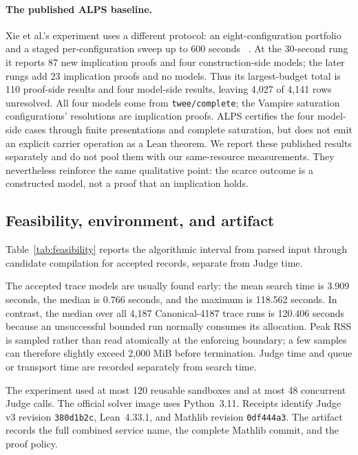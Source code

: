 \documentclass[runningheads]{llncs}
\begin{document}
\paragraph{The published ALPS baseline.}
Xie et al.'s experiment uses a different protocol: an eight-configuration
portfolio and a staged per-configuration sweep up to 600 seconds
~\cite{XieEtAl2026ALPS,ALPSData2026}.  At the 30-second rung it reports 87 new
implication proofs and four construction-side models; the later rungs add 23
implication proofs and no models.  Thus its largest-budget total is 110
proof-side results and four model-side results, leaving 4,027 of 4,141 rows
unresolved.  All four models come from \texttt{twee/complete}; the Vampire
saturation configurations' resolutions are implication proofs.  ALPS certifies
the four model-side cases through finite presentations and complete saturation,
but does not emit an explicit carrier operation as a Lean theorem.  We report
these published results separately and do not pool them with our same-resource
measurements.  They nevertheless reinforce the same qualitative point: the
scarce outcome is a constructed model, not a proof that an implication holds.

\subsection{Feasibility, environment, and artifact}

Table~\ref{tab:feasibility} reports the algorithmic interval from parsed input
through candidate compilation for accepted records, separate from Judge time.



The accepted trace models are usually found early: the mean search time is
3.909 seconds, the median is 0.766 seconds, and the maximum is 118.562 seconds.
In contrast, the median
over all 4,187 Canonical-4187 trace runs is 120.406 seconds because an unsuccessful bounded
run normally consumes its allocation.  Peak RSS is sampled rather than read
atomically at the enforcing boundary; a few samples can therefore slightly
exceed 2,000 MiB before termination.  Judge time and queue or transport time
are recorded separately from search time.

The experiment used at most 120 reusable sandboxes and at most 48 concurrent
Judge calls.  The official solver image uses Python~3.11.  Receipts identify
Judge v3 revision \texttt{380d1b2c}, Lean~4.33.1, and Mathlib revision
\texttt{0df444a3}.  The artifact records the full combined service name,
the complete Mathlib commit, and the proof policy.
\end{document}

